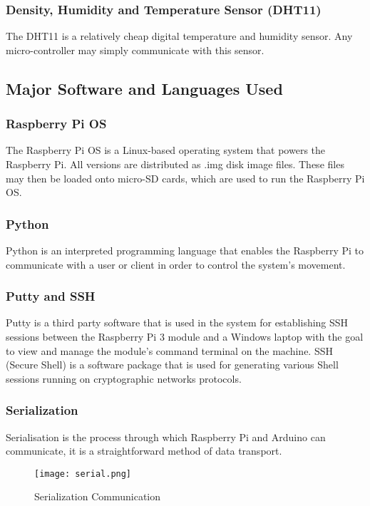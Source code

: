 \documentclass[conference,a4paper]{IEEEtran}
\begin{document}
\subsubsection{Density, Humidity and Temperature Sensor (DHT11)}
The DHT11 is a relatively cheap digital temperature and humidity sensor. Any micro-controller may simply communicate with this sensor.

\subsection{Major Software and Languages Used}
\subsubsection{Raspberry Pi OS}
The Raspberry Pi OS is a Linux-based operating system that powers the Raspberry Pi. All versions are distributed as .img disk image files. These files may then be loaded onto micro-SD cards, which are used to run the Raspberry Pi OS.

\subsubsection{Python}
Python is an interpreted programming language that enables the Raspberry Pi to communicate with a user or client in order to control the system's movement.

\subsubsection{Putty and SSH} 
Putty is a third party software that is used in the system for establishing SSH sessions between the Raspberry Pi 3 module and a Windows laptop with the goal to view and manage the module's command terminal on the machine. \cite{6} SSH (Secure Shell) is a software package that is used for generating various Shell sessions running on cryptographic networks protocols.

\subsubsection{Serialization}
Serialisation is the process through which Raspberry Pi and Arduino can communicate, it is a straightforward method of data transport. 

\begin{figure}[ht]
\centering
\texttt{[image: serial.png]}
\caption{Serialization Communication}
\label{Fig: Seralization}
\end{figure}
\end{document}

